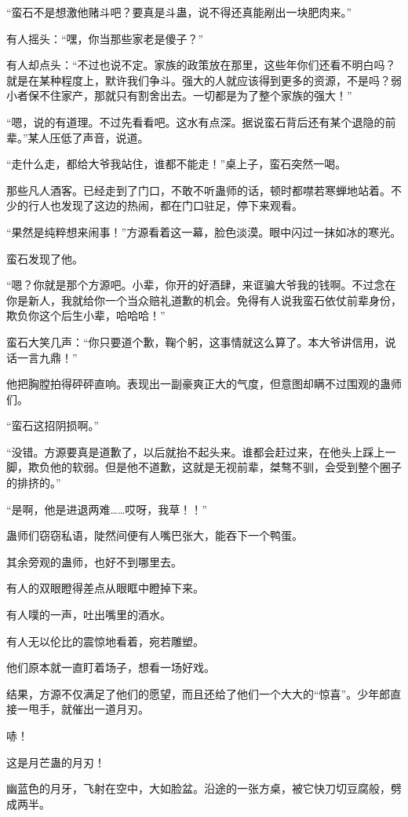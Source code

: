 \begin{this_body}
“蛮石不是想激他赌斗吧？要真是斗蛊，说不得还真能剐出一块肥肉来。”

有人摇头：“嘿，你当那些家老是傻子？”

有人却点头：“不过也说不定。家族的政策放在那里，这些年你们还看不明白吗？就是在某种程度上，默许我们争斗。强大的人就应该得到更多的资源，不是吗？弱小者保不住家产，那就只有割舍出去。一切都是为了整个家族的强大！”

“嗯，说的有道理。不过先看看吧。这水有点深。据说蛮石背后还有某个退隐的前辈。”某人压低了声音，说道。

“走什么走，都给大爷我站住，谁都不能走！”桌上子，蛮石突然一喝。

那些凡人酒客。已经走到了门口，不敢不听蛊师的话，顿时都噤若寒蝉地站着。不少的行人也发现了这边的热闹，都在门口驻足，停下来观看。

“果然是纯粹想来闹事！”方源看着这一幕，脸色淡漠。眼中闪过一抹如冰的寒光。

蛮石发现了他。

“嗯？你就是那个方源吧。小辈，你开的好酒肆，来诓骗大爷我的钱啊。不过念在你是新人，我就给你一个当众赔礼道歉的机会。免得有人说我蛮石依仗前辈身份，欺负你这个后生小辈，哈哈哈！”

蛮石大笑几声：“你只要道个歉，鞠个躬，这事情就这么算了。本大爷讲信用，说话一言九鼎！”

他把胸膛拍得砰砰直响。表现出一副豪爽正大的气度，但意图却瞒不过围观的蛊师们。

“蛮石这招阴损啊。”

“没错。方源要真是道歉了，以后就抬不起头来。谁都会赶过来，在他头上踩上一脚，欺负他的软弱。但是他不道歉，这就是无视前辈，桀骜不驯，会受到整个圈子的排挤的。”

“是啊，他是进退两难……哎呀，我草！！”

蛊师们窃窃私语，陡然间便有人嘴巴张大，能吞下一个鸭蛋。

其余旁观的蛊师，也好不到哪里去。

有人的双眼瞪得差点从眼眶中瞪掉下来。

有人噗的一声，吐出嘴里的酒水。

有人无以伦比的震惊地看着，宛若雕塑。

他们原本就一直盯着场子，想看一场好戏。

结果，方源不仅满足了他们的愿望，而且还给了他们一个大大的“惊喜”。少年郎直接一甩手，就催出一道月刃。

哧！

这是月芒蛊的月刃！

幽蓝色的月牙，飞射在空中，大如脸盆。沿途的一张方桌，被它快刀切豆腐般，劈成两半。


\end{this_body}
